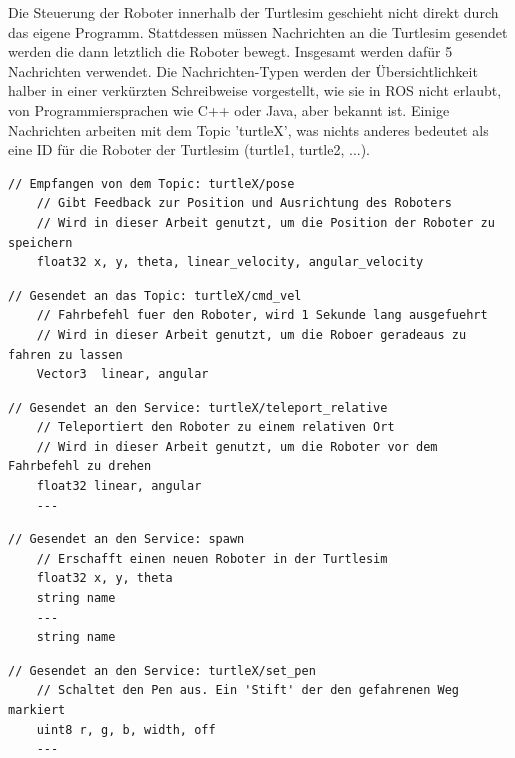 Die Steuerung der Roboter innerhalb der Turtlesim geschieht nicht direkt durch das eigene Programm. Stattdessen müssen Nachrichten an die Turtlesim gesendet werden die dann letztlich die Roboter bewegt. Insgesamt werden dafür 5 Nachrichten verwendet. Die Nachrichten-Typen werden der Übersichtlichkeit halber in einer verkürzten Schreibweise vorgestellt, wie sie in \ac{ROS} nicht erlaubt, von Programmiersprachen wie C++ oder Java, aber bekannt ist. Einige Nachrichten arbeiten mit dem Topic 'turtleX', was nichts anderes bedeutet als eine ID für die Roboter der Turtlesim (turtle1, turtle2, ...).

\begin{lstlisting}[style=ros, title=turtlesim/Pose.msg]
	// Empfangen von dem Topic: turtleX/pose
	// Gibt Feedback zur Position und Ausrichtung des Roboters
	// Wird in dieser Arbeit genutzt, um die Position der Roboter zu speichern
	float32 x, y, theta, linear_velocity, angular_velocity
\end{lstlisting}

\begin{lstlisting}[style=ros, title=geometry\_msgs/Twist.msg]
	// Gesendet an das Topic: turtleX/cmd_vel
	// Fahrbefehl fuer den Roboter, wird 1 Sekunde lang ausgefuehrt
	// Wird in dieser Arbeit genutzt, um die Roboer geradeaus zu fahren zu lassen
	Vector3  linear, angular
\end{lstlisting}

\begin{lstlisting}[style=ros, title=turtlesim/TeleportRelative Service]
	// Gesendet an den Service: turtleX/teleport_relative
	// Teleportiert den Roboter zu einem relativen Ort
	// Wird in dieser Arbeit genutzt, um die Roboter vor dem Fahrbefehl zu drehen
	float32 linear, angular
	---
\end{lstlisting}


\newpage
\begin{lstlisting}[style=ros, title=turtlesim/Spawn Service]
	// Gesendet an den Service: spawn
	// Erschafft einen neuen Roboter in der Turtlesim
	float32 x, y, theta
	string name
	---
	string name
\end{lstlisting}

\begin{lstlisting}[style=ros, title=turtlesim/SetPen Service]
	// Gesendet an den Service: turtleX/set_pen
	// Schaltet den Pen aus. Ein 'Stift' der den gefahrenen Weg markiert
	uint8 r, g, b, width, off
	---
\end{lstlisting}

